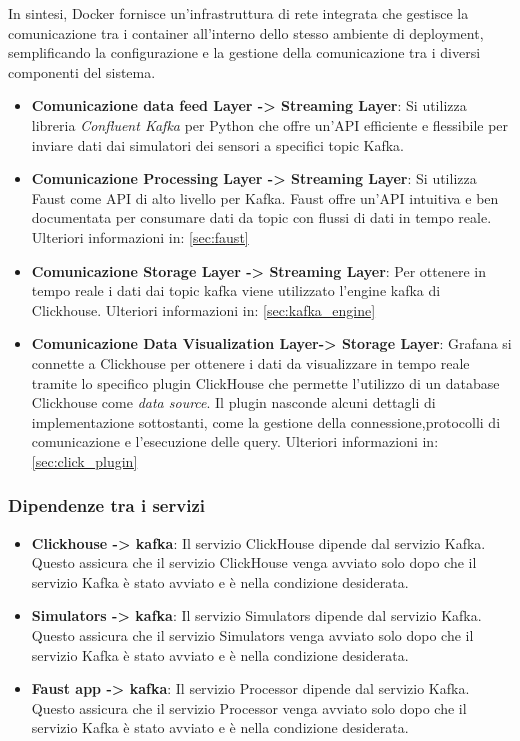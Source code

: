 In sintesi, Docker fornisce un'infrastruttura di rete integrata che gestisce la comunicazione tra i container all'interno dello stesso ambiente di deployment, semplificando la configurazione e la gestione della comunicazione tra i diversi componenti del sistema.
\begin{itemize}
    \item \textbf{Comunicazione data feed Layer -> Streaming Layer}: Si utilizza libreria \textit{Confluent Kafka} per Python che offre un'API efficiente e flessibile per inviare dati dai simulatori dei sensori a specifici topic Kafka.
    \item \textbf{Comunicazione Processing Layer -> Streaming Layer}: Si utilizza Faust come API di alto livello per Kafka. Faust offre un'API intuitiva e ben documentata per consumare dati da topic con flussi di dati in tempo reale.
    Ulteriori informazioni in: \ref{sec:faust}
    \item \textbf{Comunicazione Storage Layer -> Streaming Layer}: Per ottenere in tempo reale i dati dai topic kafka viene utilizzato l'engine kafka di Clickhouse. Ulteriori informazioni in: \ref{sec:kafka_engine}
    \item \textbf{Comunicazione Data Visualization Layer-> Storage Layer}: Grafana si connette a Clickhouse per ottenere i dati da visualizzare in tempo reale tramite lo specifico plugin ClickHouse che permette l'utilizzo di un database Clickhouse come \textit{data source}.
    Il plugin nasconde alcuni dettagli di implementazione sottostanti, come la gestione della connessione,protocolli di comunicazione e l'esecuzione delle query. Ulteriori informazioni in: \ref{sec:click_plugin}
\end{itemize}
    





    \subsubsection{Dipendenze tra i servizi}
\begin{itemize}
    \item \textbf{Clickhouse -> kafka}: Il servizio ClickHouse dipende dal servizio Kafka. Questo assicura che il servizio ClickHouse venga avviato solo dopo che il servizio Kafka è stato avviato e è nella condizione desiderata.

    \item \textbf{Simulators -> kafka}: Il servizio Simulators dipende dal servizio Kafka. Questo assicura che il servizio Simulators venga avviato solo dopo che il servizio Kafka è stato avviato e è nella condizione desiderata.
    
    \item \textbf{ Faust app -> kafka}: Il servizio Processor dipende dal servizio Kafka. Questo assicura che il servizio Processor venga avviato solo dopo che il servizio Kafka è stato avviato e è nella condizione desiderata.
\end{itemize}

